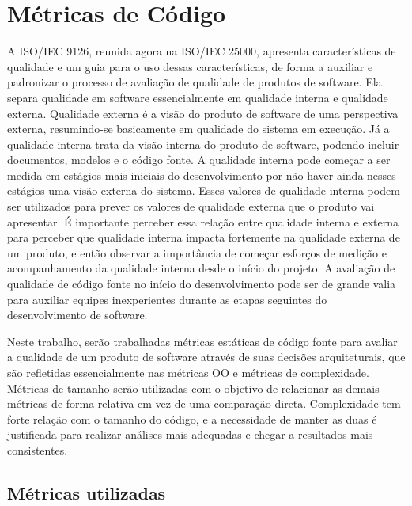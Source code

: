 \chapter{Métricas de Código}
\label{cap:metricas}

A ISO/IEC 9126, reunida agora na ISO/IEC 25000, apresenta características de qualidade e um guia para o uso dessas características, de forma a auxiliar e padronizar o processo de avaliação de qualidade de produtos de software. Ela separa qualidade em software essencialmente em qualidade interna e qualidade externa. Qualidade externa é a visão do produto de software de uma perspectiva externa, resumindo-se basicamente em qualidade do sistema em execução. Já a qualidade interna trata da visão interna do produto de software, podendo incluir documentos, modelos e o código fonte. A qualidade interna pode começar a ser medida em estágios mais iniciais do desenvolvimento por não haver ainda nesses estágios uma visão externa do sistema. Esses valores de qualidade interna podem ser utilizados para prever os valores de qualidade externa que o produto vai apresentar. É importante perceber essa relação entre qualidade interna e externa para perceber que qualidade interna impacta fortemente na qualidade externa de um produto, e então observar a importância de começar esforços de medição e acompanhamento da qualidade interna desde o início do projeto. A avaliação de qualidade de código fonte no início do desenvolvimento pode ser de grande valia para auxiliar equipes inexperientes durante as etapas seguintes do desenvolvimento de software.

Neste trabalho, serão trabalhadas métricas estáticas de código fonte para avaliar a qualidade de um produto de software através de suas decisões arquiteturais, que são refletidas essencialmente nas métricas OO e métricas de complexidade. Métricas de tamanho serão utilizadas com o objetivo de relacionar as demais métricas de forma relativa em vez de uma comparação direta. Complexidade tem forte relação com o tamanho do código, e a necessidade de manter as duas é justificada para realizar análises mais adequadas e chegar a resultados mais consistentes.

\section{Métricas utilizadas}

